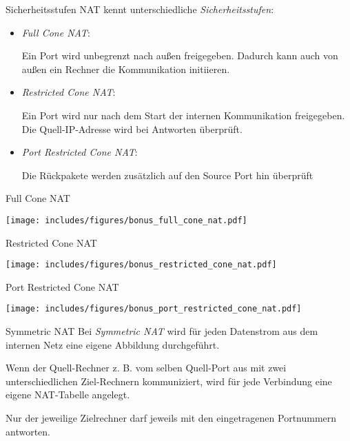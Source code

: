 \begin{bonus}{Sicherheitsstufen}
    NAT kennt unterschiedliche \emph{Sicherheitsstufen}:
    \begin{itemize}
        \item \emph{Full Cone NAT}:

              Ein Port wird unbegrenzt nach außen freigegeben.
              Dadurch kann auch von außen ein Rechner die Kommunikation initiieren.
        \item \emph{Restricted Cone NAT}:

              Ein Port wird nur nach dem Start der internen Kommunikation freigegeben.
              Die Quell-IP-Adresse wird bei Antworten überprüft.
        \item \emph{Port Restricted Cone NAT}:

              Die Rückpakete werden zusätzlich auf den Source Port hin überprüft
    \end{itemize}
\end{bonus}

\begin{example}{Full Cone NAT}
    \begin{center}
        \texttt{[image: includes/figures/bonus\_full\_cone\_nat.pdf]}
    \end{center}
\end{example}

\begin{example}{Restricted Cone NAT}
    \begin{center}
        \texttt{[image: includes/figures/bonus\_restricted\_cone\_nat.pdf]}
    \end{center}
\end{example}

\begin{example}{Port Restricted Cone NAT}
    \begin{center}
        \texttt{[image: includes/figures/bonus\_port\_restricted\_cone\_nat.pdf]}
    \end{center}
\end{example}

\begin{bonus}{Symmetric NAT}
    Bei \emph{Symmetric NAT} wird für jeden Datenstrom aus dem internen Netz eine eigene Abbildung durchgeführt.

    Wenn der Quell-Rechner z. B. vom selben Quell-Port aus mit zwei unterschiedlichen Ziel-Rechnern kommuniziert, wird für jede Verbindung eine eigene NAT-Tabelle angelegt.

    Nur der jeweilige Zielrechner darf jeweils mit den eingetragenen Portnummern antworten.
\end{bonus}